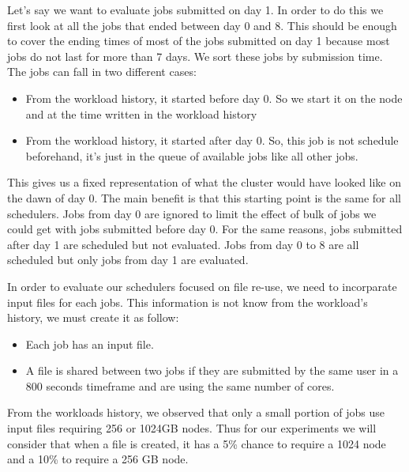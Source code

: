 \documentclass[a4paper]{article}
\begin{document}
Let's say we want to evaluate jobs submitted on day 1.
In order to do this we first look at all the jobs that ended between day 0 and 8.
This should be enough to cover the ending times of most of the jobs submitted on day 1 because most jobs do not last for more than 7 days.
We sort these jobs by submission time. 
The jobs can fall in two different cases:
\begin{itemize}
	\item From the workload history, it started before day 0. So we start it on the node and at the time written in the workload history
	\item From the workload history, it started after day 0. So, this job is not schedule beforehand, it's just in the queue of available jobs like all other jobs.
\end{itemize}
This gives us a fixed representation of what the cluster would have looked like on the dawn of day 0. The main benefit is that this starting point is the same for all schedulers.
Jobs from day 0 are ignored to limit the effect of bulk of jobs we could get with jobs submitted before day 0.
For the same reasons, jobs submitted after day 1 are scheduled but not evaluated.
Jobs from day 0 to 8 are all scheduled but only jobs from day 1 are evaluated.

In order to evaluate our schedulers focused on file re-use, we need to incorparate input files for each jobs. This information is not know from the workload's history, we must create it as follow:
\begin{itemize}
	\item Each job has an input file.
	\item A file is shared between two jobs if they are submitted by the same user in a $800$ seconds timeframe and are using the same number of cores.
\end{itemize}

From the workloads history, we observed that only a small portion of jobs use input files
requiring 256 or 1024GB nodes. Thus for our experiments we will consider that when a file is created, it has 
a 5\% chance to require a 1024 node and a 10\% to require a 256 GB node.


\end{document}
